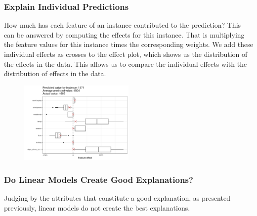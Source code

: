 \subsubsection{Explain Individual Predictions}
How much has each feature of an instance contributed to the prediction? 
This can be answered by computing the effects for this instance. That is multiplying the feature values for this instance times the corresponding weights.
We add these individual effects as crosses to the effect plot, which shows us the distribution of the effects in the data. This allows us to compare the individual effects with the distribution
of effects in the data.
\begin{figure}[H]
    \includegraphics[width=0.5\textwidth]{img/linear-effects-single-1.jpeg}
    \centering
\end{figure}
\subsubsection{Do Linear Models Create Good Explanations?}
Judging by the attributes that constitute a good explanation, as presented previously, linear models do not create the best explanations. 
